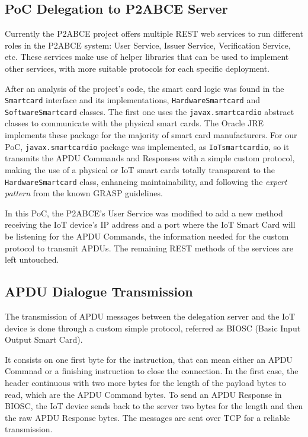 \subsection{PoC Delegation to P2ABCE Server}


Currently the P2ABCE project offers multiple REST web services to run different roles in the P2ABCE system: User Service, Issuer Service, Verification Service, etc. These services make use of helper libraries that can be used to implement other services, with more suitable protocols for each specific deployment.

After an analysis of the project's code, the smart card logic was found in  the \texttt{Smartcard} interface and its implementations, \texttt{HardwareSmartcard} and \texttt{SoftwareSmartcard} classes. The first one uses the \texttt{javax.smartcardio} abstract classes to communicate with the physical smart cards. The Oracle JRE implements these package for the majority of smart card manufacturers. For our PoC, \texttt{javax.smartcardio} package was implemented, as \texttt{IoTsmartcardio}, so it transmits the APDU Commands and Responses with a simple custom protocol, making the use of a physical or IoT smart cards totally transparent to the \texttt{HardwareSmartcard} class, enhancing maintainability, and following the \textit{expert pattern} from the known GRASP guidelines.

In this PoC, the P2ABCE's User Service was modified to add a new method receiving the IoT device's  IP address and a port where the IoT Smart Card will be listening for the APDU Commands, the information needed for the custom protocol to transmit APDUs. 
The remaining REST methods of the services are left untouched.


\subsection{APDU Dialogue Transmission}

The transmission of APDU messages between the delegation server and the IoT device is done through a custom simple protocol, referred as BIOSC (Basic Input Output Smart Card).

It consists on one first byte for the instruction, that can mean either an APDU Commnad or a finishing instruction to close the connection. 
In the first case, the header continuous with two more bytes for the length of the payload bytes to read, which are the APDU Command bytes.
To send an APDU Response in BIOSC, the IoT device sends back to the server two bytes for the length and then the raw APDU Response bytes. The messages are sent over TCP for a reliable transmission.

